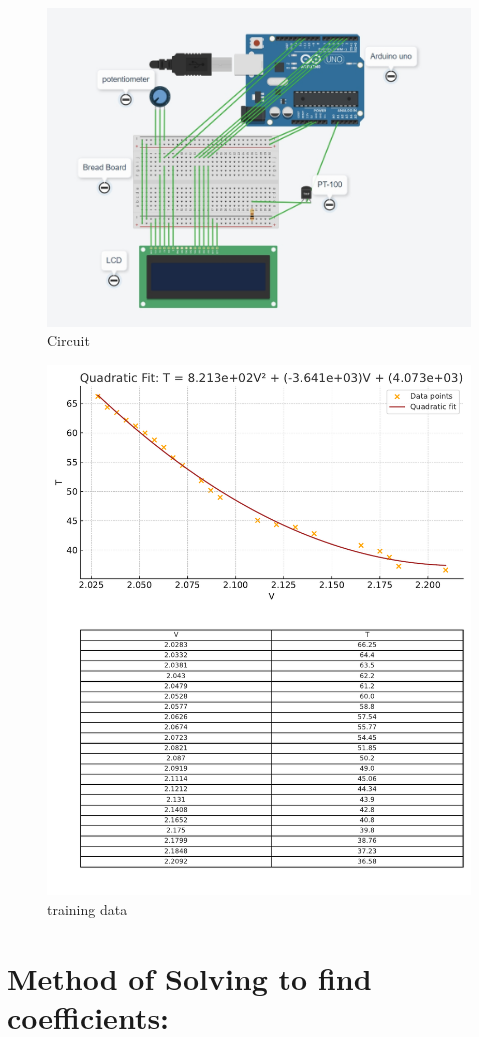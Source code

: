 \documentclass[journal]{IEEEtran}
\begin{document}
\newpage
\begin{figure}[h]
    \centering
    \includegraphics[width=0.5\linewidth]{figs/WhatsApp Image 2025-10-31 at 2.06.29 PM.jpeg}
    \caption{Circuit}
    \label{fig:placeholder}
\end{figure}
\newpage
\begin{figure}[h]
    \centering
    \includegraphics[width=0.9\linewidth]{figs/training data.pdf}
    \caption{training data}
    \label{fig:placeholder}
\end{figure}
\newpage
\section*{Method of Solving to find coefficients:}
\end{document}
